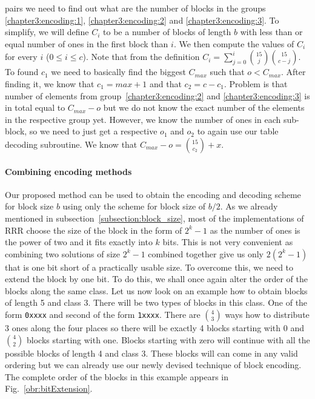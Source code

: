 
pairs we need to find out what are the number of blocks in the groups \ref{chapter3:encoding:1},
\ref{chapter3:encoding:2} and \ref{chapter3:encoding:3}. To simplify, we will define $C_i$ to be a 
number of blocks of length $b$ with less than or equal number of ones in the first block than $i$.
We then compute the values of $C_i$ for every $i$ ($0\leq i\leq c$). Note that from the definition
$C_i = \sum_{j=0}^{i} {15 \choose j} {15 \choose c-j}$. To found $c_1$ we need to basically find the
biggest $C_{max}$ such that $o<C_{max}$. After finding it, we know that $c_1 = max+1$ and that
$c_2 = c - c_1$. Problem is that number of elements from group~\ref{chapter3:encoding:2} and
\ref{chapter3:encoding:3} is in total equal to $C_{max}-o$ but we do not know the exact number
of the elements in the respective group yet. However, we know the number of ones in each sub-block,
so we need to just get a respective $o_1$ and $o_2$ to again use our table decoding subroutine. We
know that $C_{max}-o = {15 \choose c_2} + x$.

\paragraph{Combining encoding methods}

Our proposed method can be used to obtain the encoding and decoding scheme for block size $b$
using only the scheme for block size of $b/2$. As we already mentioned in
subsection~\ref{subsection:block_size}, most of the implementations of RRR choose the size
of the block in the form of $2^k-1$ as the number of ones is the power of two and it fits
exactly into $k$ bits. This is not very convenient as combining two solutions of size
$2^k-1$ combined together give us only $2(2^k-1)$ that is one bit short of a practically
usable size. To overcome this, we need to extend the block by one bit. To do this, we
shall once again alter the order of the blocks along the same class. Let us now look on
an example how to obtain blocks of length 5 and class 3. There will be two types of blocks
in this class. One of the form {\tt 0xxxx} and second of the form {\tt 1xxxx}. There are
${4\choose 3}$ ways how to distribute 3 ones along the four places so there will be exactly
4 blocks starting with 0 and ${4\choose 2}$ blocks starting with one. Blocks starting with
zero will continue with all the possible blocks of length 4 and class 3. These blocks will
can come in any valid ordering but we can already use our newly devised technique of block
encoding. The complete order of the blocks in this example appears in Fig.~\ref{obr:bitExtension}.

